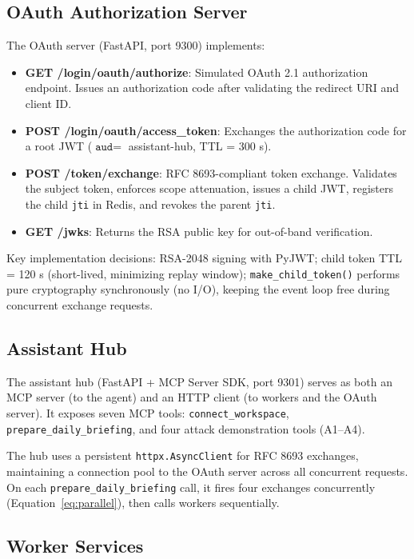 \documentclass[journal]{IEEEtran}
\begin{document}
\subsection{OAuth Authorization Server}

The OAuth server (FastAPI, port 9300) implements:

\begin{itemize}
  \item \textbf{GET /login/oauth/authorize}: Simulated OAuth 2.1 authorization endpoint. Issues an authorization code after validating the redirect URI and client ID.
  \item \textbf{POST /login/oauth/access\_token}: Exchanges the authorization code for a root JWT ($\texttt{aud} = $ assistant-hub, TTL = 300 s).
  \item \textbf{POST /token/exchange}: RFC 8693-compliant token exchange. Validates the subject token, enforces scope attenuation, issues a child JWT, registers the child \texttt{jti} in Redis, and revokes the parent \texttt{jti}.
  \item \textbf{GET /jwks}: Returns the RSA public key for out-of-band verification.
\end{itemize}

Key implementation decisions: RSA-2048 signing with PyJWT; child token TTL = 120 s (short-lived, minimizing replay window); \texttt{make\_child\_token()} performs pure cryptography synchronously (no I/O), keeping the event loop free during concurrent exchange requests.

\subsection{Assistant Hub}

The assistant hub (FastAPI + MCP Server SDK, port 9301) serves as both an MCP server (to the agent) and an HTTP client (to workers and the OAuth server). It exposes seven MCP tools: \texttt{connect\_workspace}, \texttt{prepare\_daily\_briefing}, and four attack demonstration tools (A1--A4).

The hub uses a persistent \texttt{httpx.AsyncClient} for RFC 8693 exchanges, maintaining a connection pool to the OAuth server across all concurrent requests. On each \texttt{prepare\_daily\_briefing} call, it fires four exchanges concurrently (Equation~\ref{eq:parallel}), then calls workers sequentially.

\subsection{Worker Services}
\end{document}
